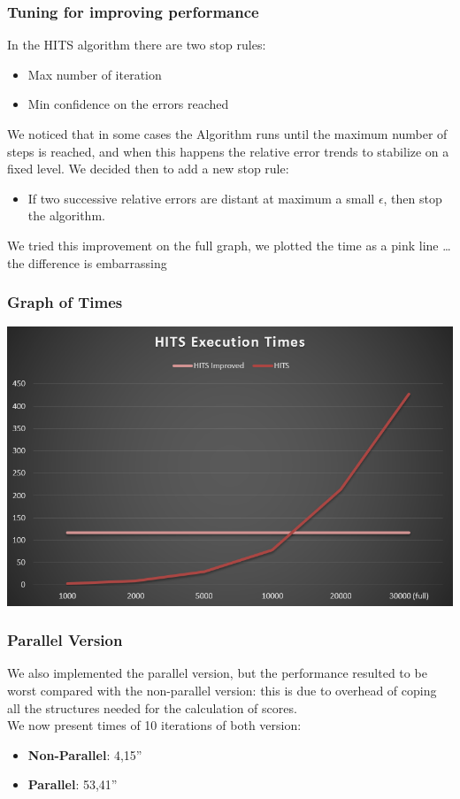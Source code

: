 \documentclass{beamer}
\begin{document}
\begin{frame}
\frametitle{Tuning for improving performance}
In the HITS algorithm there are two stop rules:
\begin{itemize}
\item Max number of iteration
\item Min confidence on the errors reached
\end{itemize}
\medskip
We noticed that in some cases the Algorithm runs until the maximum number of steps is reached, and when this happens the relative error trends to stabilize on a fixed level. We decided then to add a new stop rule: \\
\begin{itemize}
\item If two successive relative errors are distant at maximum a small $\epsilon$, then stop the algorithm.
\end{itemize}
We tried this improvement on the full graph, we plotted the time as a pink line \dots the difference is embarrassing 
\end{frame}

\begin{frame}
\frametitle{Graph of Times}
\includegraphics[scale=0.5]{img/Ranking/HITS.PNG} 
\end{frame}

\begin{frame}
\frametitle{Parallel Version}
We also implemented the parallel version, but the performance resulted to be worst compared with the non-parallel version: this is due to overhead of coping all the structures needed for the calculation of scores.\\
\medskip
We now present times of 10 iterations of both version:
\begin{itemize}
\item \textbf{Non-Parallel}: 4,15''
\item \textbf{Parallel}: 53,41''
\end{itemize} 
\end{frame}
\end{document}
